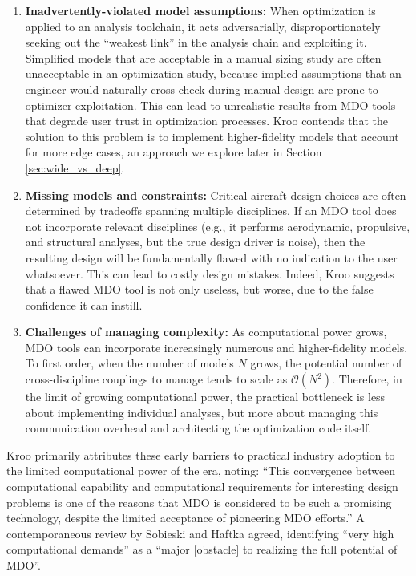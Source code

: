 \documentclass[12pt,vi,oneside]{report}
\begin{document}
    \begin{enumerate}
        \item \textbf{Inadvertently-violated model assumptions:} When optimization is applied to an analysis toolchain, it acts adversarially, disproportionately seeking out the ``weakest link'' in the analysis chain and exploiting it. Simplified models that are acceptable in a manual sizing study are often unacceptable in an optimization study, because implied assumptions that an engineer would naturally cross-check during manual design are prone to optimizer exploitation. This can lead to unrealistic results from MDO tools that degrade user trust in optimization processes. Kroo contends that the solution to this problem is to implement higher-fidelity models that account for more edge cases, an approach we explore later in Section \ref{sec:wide_vs_deep}.
        \item \textbf{Missing models and constraints:} Critical aircraft design choices are often determined by tradeoffs spanning multiple disciplines. If an MDO tool does not incorporate relevant disciplines (e.g., it performs aerodynamic, propulsive, and structural analyses, but the true design driver is noise), then the resulting design will be fundamentally flawed with no indication to the user whatsoever. This can lead to costly design mistakes. Indeed, Kroo suggests that a flawed MDO tool is not only useless, but worse, due to the false confidence it can instill.
        \item \textbf{Challenges of managing complexity:} As computational power grows, MDO tools can incorporate increasingly numerous and higher-fidelity models. To first order, when the number of models $N$ grows, the potential number of cross-discipline couplings to manage tends to scale as $\mathcal{O}(N^2)$. Therefore, in the limit of growing computational power, the practical bottleneck is less about implementing individual analyses, but more about managing this communication overhead and architecting the optimization code itself.
    \end{enumerate}

    Kroo primarily attributes these early barriers to practical industry adoption to the limited computational power of the era, noting: ``This convergence between computational capability and computational requirements for interesting design problems is one of the reasons that MDO is considered to be such a promising technology, despite the limited acceptance of pioneering MDO efforts.'' A contemporaneous review by Sobieski and Haftka agreed, identifying ``very high computational demands'' as a ``major [obstacle] to realizing the full potential of MDO''. \cite{haftka_multidisciplinary_1997}
\end{document}
